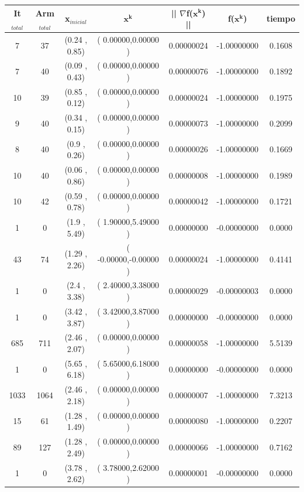 \begin{itemize}
\begin{table}[H]
\centering
\renewcommand{\arraystretch}{1.2}
\begin{tabular}{|c|c|c|c|c|c|c|}
\hline
\textbf{It$_{total}$} & \textbf{Arm$_{total}$} &\textbf{x$_{inicial}$} & \textbf{$\mathbf{x^k}$} & \textbf{|| $\nabla$f($\mathbf{x^k}$) ||} & \textbf{f($\mathbf{x^k}$)}& \textbf{tiempo} \\
\hline
7  & 37 & (0.24 , 0.85) &( 0.00000,0.00000 ) & 0.00000024 & -1.00000000 & 0.1608 \\
7  & 40 & (0.09 , 0.43) &( 0.00000,0.00000 ) & 0.00000076 & -1.00000000 & 0.1892 \\
10  & 39 & (0.85 , 0.12) &( 0.00000,0.00000 ) & 0.00000024 & -1.00000000 & 0.1975 \\
9  & 40 & (0.34 , 0.15) &( 0.00000,0.00000 ) & 0.00000073 & -1.00000000 & 0.2099 \\
8  & 40 & (0.9 , 0.26) &( 0.00000,0.00000 ) & 0.00000026 & -1.00000000 & 0.1669 \\
10  & 40 & (0.06 , 0.86) &( 0.00000,0.00000 ) & 0.00000008 & -1.00000000 & 0.1989 \\
10  & 42 & (0.59 , 0.78) &( 0.00000,0.00000 ) & 0.00000042 & -1.00000000 & 0.1721 \\
1  & 0 & (1.9 , 5.49) &( 1.90000,5.49000 ) & 0.00000000 & -0.00000000 & 0.0000 \\
43  & 74 & (1.29 , 2.26) &( -0.00000,-0.00000 ) & 0.00000024 & -1.00000000 & 0.4141 \\
1  & 0 & (2.4 , 3.38) &( 2.40000,3.38000 ) & 0.00000029 & -0.00000003 & 0.0000 \\
1  & 0 & (3.42 , 3.87) &( 3.42000,3.87000 ) & 0.00000000 & -0.00000000 & 0.0000 \\
685  & 711 & (2.46 , 2.07) &( 0.00000,0.00000 ) & 0.00000058 & -1.00000000 & 5.5139 \\
1  & 0 & (5.65 , 6.18) &( 5.65000,6.18000 ) & 0.00000000 & -0.00000000 & 0.0000 \\
1033  & 1064 & (2.46 , 2.18) &( 0.00000,0.00000 ) & 0.00000007 & -1.00000000 & 7.3213 \\
15  & 61 & (1.28 , 1.49) &( 0.00000,0.00000 ) & 0.00000080 & -1.00000000 & 0.2207 \\
89  & 127 & (1.28 , 2.49) &( 0.00000,0.00000 ) & 0.00000066 & -1.00000000 & 0.7162 \\
1  & 0 & (3.78 , 2.62) &( 3.78000,2.62000 ) & 0.00000001 & -0.00000000 & 0.0000 \\
\hline
\end{tabular}
\end{table}


\end{itemize}
